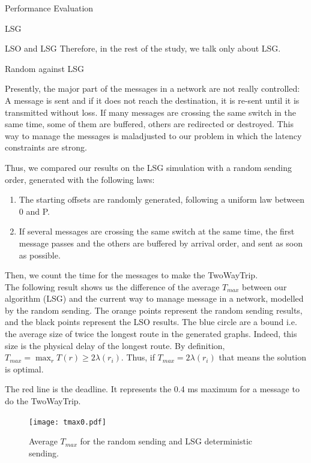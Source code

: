 \documentclass[a4paper,10pt]{report}
\begin{document}
\begin{chapter}{Performance Evaluation}
\begin{section}{LSG}
\begin{subsection}{LSO and LSG}
Therefore, in the rest of the study, we talk only about LSG.
\end{subsection}


\begin{subsection}{Random against LSG}

Presently, the major part of the messages in a network are not really controlled: A message is sent and if it does not reach the destination,
it is re-sent until it is transmitted without loss. If many messages are crossing the same switch in the same time, some of them are buffered,
others are redirected or destroyed. This way to manage the messages is maladjusted to our problem in which the latency constraints are strong.

Thus, we compared our results on the LSG simulation with a random sending order, generated with the following laws: 
\begin{enumerate}
 \item The starting offsets are randomly generated, following a uniform law between 0 and P.
 \item If several messages are crossing the same switch at the same time, the first message passes and the others are buffered by arrival order, and sent as soon as possible.
\end{enumerate}

Then, we count the time for the messages to make the TwoWayTrip.\\
 
The following result shows us the difference of the average $T_{max}$ between our algorithm (LSG) and the current way to manage message in a network, modelled by the random sending.
The orange points represent the random sending results, and the black points represent the LSO results.
The blue circle are a bound i.e. the average size of twice the longest route in the generated graphs.
Indeed, this size is the physical delay of the longest route.
By definition, $T_{max} = \max_r T(r) \geq 2\lambda(r_i)$.
Thus, if $T_{max} = 2\lambda(r_i)$  that means the solution is optimal.

The red line is the deadline. It represents the 0.4 ms maximum for a message to do the TwoWayTrip.

\begin{figure}[H]
\hspace*{-3cm}
\centering
\texttt{[image: tmax0.pdf]}%
\caption{Average $T_{max}$ for the random sending and LSG deterministic sending.}
\end{figure}


\end{subsection}
\end{section}
\end{chapter}
\end{document}

